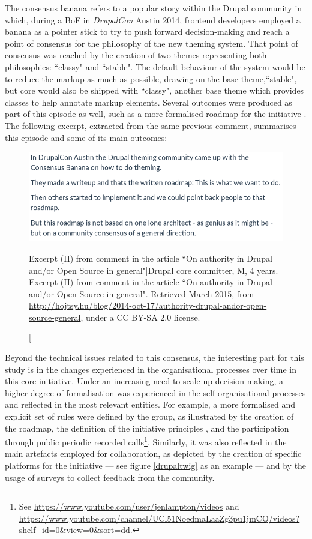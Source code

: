 The consensus banana refers to a popular story within the Drupal community in which, during a BoF in \textit{DrupalCon} Austin 2014, frontend developers employed a banana as a pointer stick to try to push forward decision-making and reach a point of consensus for the philosophy of the new theming system. That point of consensus was reached by the creation of two themes representing both philosophies: ``classy" and ``stable". The default behaviour of the system would be to reduce the markup as much as possible, drawing on the base theme,``stable", but core would also be shipped with ``classy", another base theme which provides classes to help annotate markup elements. Several outcomes were produced as part of this episode as well, such as a more formalised roadmap for the initiative \parencite{consensus-banana:Online}. The following excerpt, extracted from the same previous comment, summarises this episode and some of its main outcomes:

\begin{figure}[H]
\centering
\includegraphics[scale=0.5]{img/quotes_replacement/quote_twig_cc2.png}
 \caption[Excerpt (II) from comment in the article ``On authority in Drupal and/or Open Source in general"]{Drupal core committer, M, 4 years. Excerpt (II) from comment in the article ``On authority in Drupal and/or Open Source in general". Retrieved  March 2015, from \url{http://hojtsy.hu/blog/2014-oct-17/authority-drupal-andor-open-source-general}, under a CC BY-SA 2.0 license.}
\label{quote_twig_core_02}
\end{figure}

Beyond the technical issues related to this consensus, the interesting part for this study is in the changes experienced in the organisational processes over time in this core initiative. Under an increasing need to scale up decision-making, a higher degree of formalisation was experienced in the self-organisational processes and reflected in the most relevant entities. For example, a more formalised and explicit set of rules were defined by the group, as illustrated by the creation of the roadmap, the definition of the initiative principles \parencite{twig-core-guidelines:Online}, and the participation through public periodic recorded calls\footnote{See \url{https://www.youtube.com/user/jenlampton/videos} and \url{https://www.youtube.com/channel/UCl51NoedmaLaaZg3pu1jmCQ/videos?shelf_id=0&view=0&sort=dd}.}. Similarly, it was also reflected in the main artefacts employed for collaboration, as depicted by the creation of specific platforms for the initiative --- see figure \ref{drupaltwig} as an example --- and by the usage of surveys to collect feedback from the community.

